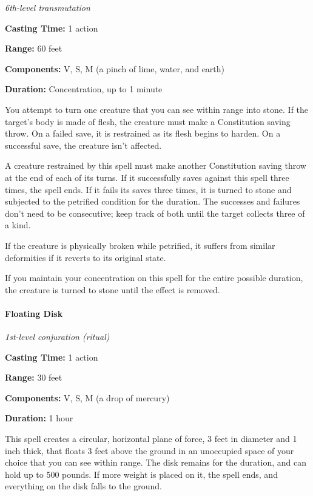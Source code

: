 \documentclass[
]{article}
\begin{document}
\emph{6th-level transmutation}

\textbf{Casting Time:} 1 action

\textbf{Range:} 60 feet

\textbf{Components:} V, S, M (a pinch of lime, water, and earth)

\textbf{Duration:} Concentration, up to 1 minute

You attempt to turn one creature that you can see within range into
stone. If the target's body is made of flesh, the creature must make a
Constitution saving throw. On a failed save, it is restrained as its
flesh begins to harden. On a successful save, the creature isn't
affected.

A creature restrained by this spell must make another Constitution
saving throw at the end of each of its turns. If it successfully saves
against this spell three times, the spell ends. If it fails its saves
three times, it is turned to stone and subjected to the petrified
condition for the duration. The successes and failures don't need to be
consecutive; keep track of both until the target collects three of a
kind.

If the creature is physically broken while petrified, it suffers from
similar deformities if it reverts to its original state.

If you maintain your concentration on this spell for the entire possible
duration, the creature is turned to stone until the effect is removed.

\hypertarget{floating-disk}{%
\paragraph{Floating Disk}\label{floating-disk}}

\emph{1st-level conjuration (ritual)}

\textbf{Casting Time:} 1 action

\textbf{Range:} 30 feet

\textbf{Components:} V, S, M (a drop of mercury)

\textbf{Duration:} 1 hour

This spell creates a circular, horizontal plane of force, 3 feet in
diameter and 1 inch thick, that floats 3 feet above the ground in an
unoccupied space of your choice that you can see within range. The disk
remains for the duration, and can hold up to 500 pounds. If more weight
is placed on it, the spell ends, and everything on the disk falls to the
ground.
\end{document}

